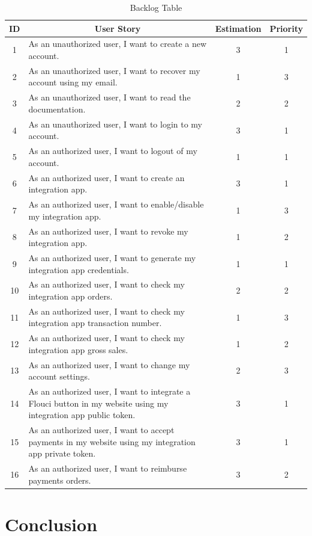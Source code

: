 \begin{spacing}{1.2}
\begin{table}[!h]
\centering
\caption{Backlog Table}
\begin{tabularx}{\linewidth}{|c|X|c|c|}
\hline
ID & \multicolumn{1}{c|}{User Story} & Estimation & Priority \\ \hline
1 & As an unauthorized user, I want to create a new account. &  3 & 1  \\  \hline
2 & As an unauthorized user, I want to recover my account using my email. &  1 & 3 \\ \hline
3 & As an unauthorized user, I want to read the documentation. & 2 & 2 \\ \hline
4 & As an unauthorized user, I want to login to my account. & 3 & 1 \\ \hline
5 & As an authorized user, I want to logout of my account. & 1 & 1 \\ \hline
6 & As an authorized user, I want to create an integration app. & 3 & 1 \\ \hline
7 & As an authorized user, I want to  enable/disable my integration app. & 1 & 3 \\ \hline
8 & As an authorized user, I want to  revoke my integration app. & 1 & 2 \\ \hline
9 & As an authorized user, I want to  generate my integration app credentials. & 1 & 1 \\ \hline
10 & As an authorized user, I want to check my integration app orders. & 2 & 2 \\ \hline
11 & As an authorized user, I want to check my integration app transaction number. & 1 & 3 \\ \hline
12 & As an authorized user, I want to check my integration app gross sales. & 1 & 2 \\ \hline
13 & As an authorized user, I want to change my account settings. & 2 & 3 \\ \hline
14 & As an authorized user, I want to integrate a Flouci button in my website using my integration app public token. & 3 & 1 \\ \hline
15 & As an authorized user, I want to accept payments in my website using my integration app private token. & 3 & 1 \\ \hline
16 & As an authorized user, I want to reimburse payments orders. & 3 & 2 \\ \hline
\end{tabularx}
\end{table}

\section*{Conclusion}


\end{spacing}
